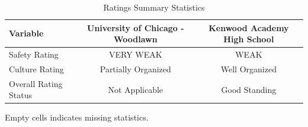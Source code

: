 \begin{table}[H]
\renewcommand{\arraystretch}{1.5}
\caption*{
{\large Ratings Summary Statistics}
} 

\fontsize{10pt}{11pt}\selectfont

\begin{tabular*}{\linewidth}{@{\extracolsep{\fill}}lcc}
\toprule
Variable & University of Chicago - Woodlawn & Kenwood Academy High School \\ 
\midrule\addlinespace[2.5pt]
Safety Rating & VERY WEAK & WEAK \\
Culture Rating & Partially Organized & Well Organized \\
Overall Rating Status & Not Applicable & Good Standing \\
\bottomrule
\end{tabular*}
\begin{minipage}{\linewidth}
Empty cells indicates missing statistics.\\
\end{minipage}
\end{table}
